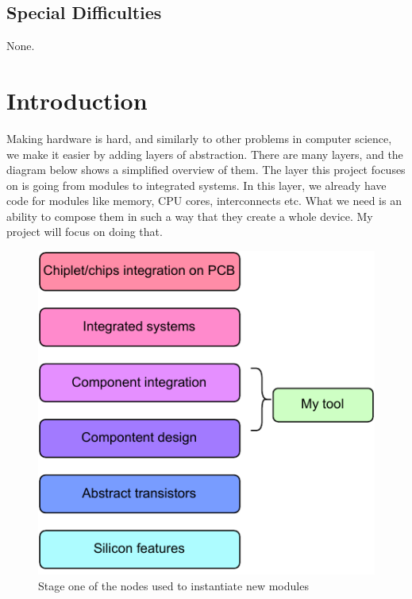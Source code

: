 \documentclass[12pt]{report}
\begin{document}
\section*{Special Difficulties}

None.




\tableofcontents

\chapter{Introduction}
Making hardware is hard, and similarly to other problems in computer science, we make it easier by adding layers of abstraction. There are many layers, and the diagram below shows a simplified overview of them. The layer this project focuses on is going from modules to integrated systems. In this layer, we already have code for modules like memory, CPU cores, interconnects etc. What we need is an ability to compose them in such a way that they create a whole device. My project will focus on doing that.
\begin{figure}[h!]
    \centering
    \includegraphics[width=0.5\columnwidth]{pdfExports/LargeMapLayersOfAbstraction.pdf}
    \caption{Stage one of the nodes used to instantiate new modules}
\end{figure}
%     
\end{document}
